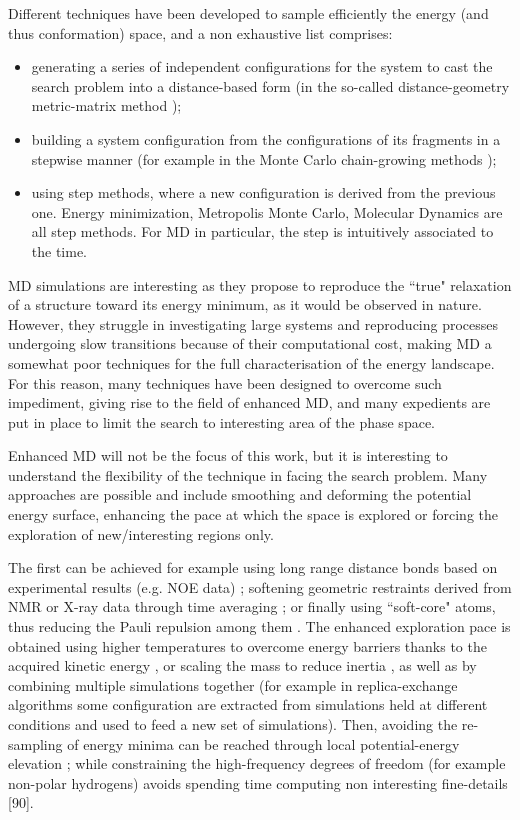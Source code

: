 Different techniques have been developed to sample efficiently the energy (and thus conformation) space, and a non exhaustive list comprises:
\begin{itemize}
\item generating a series of independent configurations for the system to cast the search problem into a distance-based form (in the so-called distance-geometry metric-matrix method \cite{72, 73});
\item building a system configuration from the configurations of its fragments in a stepwise manner (for example in the Monte Carlo chain-growing methods \cite{7, 78});
\item using step methods, where a new configuration is derived from the previous one. Energy minimization, Metropolis Monte Carlo, Molecular Dynamics\cite{80} are all step methods. For MD in particular, the step is intuitively associated to the time.
\end{itemize}
MD simulations are interesting as they propose to reproduce the ``true" relaxation of a structure toward its energy minimum, as it would be observed in nature. However, they struggle in investigating large systems and reproducing processes undergoing slow transitions because of their computational cost, making MD a somewhat poor techniques for the full characterisation of the energy landscape.
%
For this reason, many techniques have been designed to overcome such impediment, giving rise to the field of enhanced MD, and many expedients are put in place to limit the search to interesting area of the phase space.

Enhanced MD will not be the focus of this work, but it is interesting to understand the flexibility of the technique in facing the search problem. Many approaches are possible and include smoothing and deforming the potential energy surface, enhancing the pace at which the space is explored or forcing the exploration of new/interesting regions only.

The first can be achieved for example using long range distance bonds based on experimental results (e.g. NOE data) \cite{82}; softening geometric restraints derived from NMR or X-ray data through time averaging \cite{87,88}; or finally using ``soft-core" atoms, thus reducing the Pauli repulsion among them \cite{83}.
%
The enhanced exploration pace is obtained using higher temperatures to overcome energy barriers thanks to the acquired kinetic energy \cite{91}, or scaling the mass to reduce inertia \cite{92}, as well as by combining multiple simulations together (for example in replica-exchange algorithms \cite{62}some configuration are extracted from simulations held at different conditions and used to feed a new set of simulations).
%
Then, avoiding the re-sampling of energy minima can be reached through local potential-energy elevation \cite{85,86}; while constraining the high-frequency degrees of freedom (for example non-polar hydrogens) avoids spending time computing non interesting fine-details [90].

